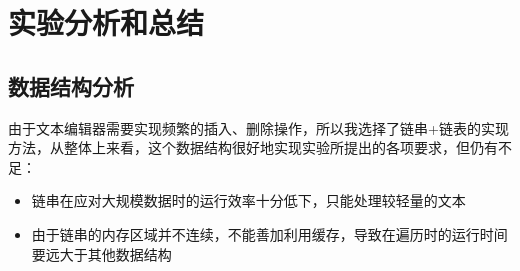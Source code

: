 \section{实验分析和总结}
    \subsection{数据结构分析}
        \par 由于文本编辑器需要实现频繁的插入、删除操作，所以我选择了链串+链表的实现方法，从整体上来看，这个数据结构很好地实现实验所提出的各项要求，但仍有不足：
        \begin{itemize}
            \item 链串在应对大规模数据时的运行效率十分低下，只能处理较轻量的文本
            \item 由于链串的内存区域并不连续，不能善加利用缓存，导致在遍历时的运行时间要远大于其他数据结构
        \end{itemize}
